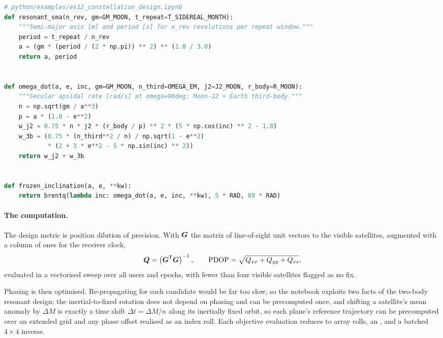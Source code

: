 \begin{lstlisting}[language=py, caption={Resonant semi-major axis and frozen inclination.}, label={lst:tut-ex12-design}]
# python/examples/ex12_constellation_design.ipynb
def resonant_sma(n_rev, gm=GM_MOON, t_repeat=T_SIDEREAL_MONTH):
    """Semi-major axis [m] and period [s] for n_rev revolutions per repeat window."""
    period = t_repeat / n_rev
    a = (gm * (period / (2 * np.pi)) ** 2) ** (1.0 / 3.0)
    return a, period


def omega_dot(a, e, inc, gm=GM_MOON, n_third=OMEGA_EM, j2=J2_MOON, r_body=R_MOON):
    """Secular apsidal rate [rad/s] at omega=90deg: Moon-J2 + Earth third-body."""
    n = np.sqrt(gm / a**3)
    p = a * (1.0 - e**2)
    w_j2 = 0.75 * n * j2 * (r_body / p) ** 2 * (5 * np.cos(inc) ** 2 - 1.0)
    w_3b = (0.75 * (n_third**2 / n) / np.sqrt(1 - e**2)
            * (2 + 3 * e**2 - 5 * np.sin(inc) ** 2))
    return w_j2 + w_3b


def frozen_inclination(a, e, **kw):
    return brentq(lambda inc: omega_dot(a, e, inc, **kw), 5 * RAD, 89 * RAD)
\end{lstlisting}

\paragraph{The computation.}
The design metric is position dilution of precision. With $\bm{G}$ the matrix
of line-of-sight unit vectors to the visible satellites, augmented with a column
of ones for the receiver clock,
\begin{equation}
  \bm{Q} = \left(\bm{G}^{\mathsf{T}} \bm{G}\right)^{-1},
  \qquad
  \mathrm{PDOP} = \sqrt{Q_{xx} + Q_{yy} + Q_{zz}},
  \label{eq:tut-pdop}
\end{equation}
evaluated in a vectorised sweep over all users and epochs, with fewer than four
visible satellites flagged as no fix.

Phasing is then optimised. Re-propagating for each candidate would be far too
slow, so the notebook exploits two facts of the two-body resonant design: the
inertial-to-fixed rotation does not depend on phasing and can be precomputed
once, and shifting a satellite's mean anomaly by $\Delta M$ is exactly a time
shift $\Delta t = \Delta M/n$ along its inertially fixed orbit, so each plane's
reference trajectory can be precomputed over an extended grid and any phase
offset realised as an index roll. Each objective evaluation reduces to array
rolls, an , and a batched $4\times4$ inverse.

